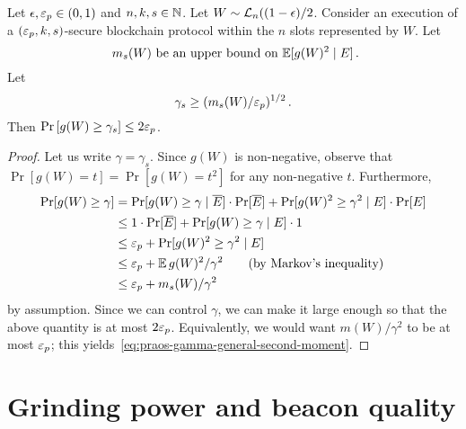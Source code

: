 \begin{lemma}\label{lemma:praos-tail-gamma}
  Let $\epsilon, \mathsf{\varepsilon}_p \in (0, 1)$ and $n, k, s \in \mathbb{N}$. 
  Let $W \sim \mathcal{L}_n((1-\epsilon)/2$.
  Consider an execution of a $(\mathsf{\varepsilon}_p, k, s)$-secure blockchain protocol within
  the $n$ slots represented by $W$. 
  Let 
  $$
    \text{ $m_s(W)$ be an upper bound on $\operatorname{\mathbb{E}}[ g(W)^2 \mid E]$}\,.
  $$
  Let 
  \begin{equation}\label{eq:praos-gamma-general-second-moment}
    \gamma_s \geq (m_s(W)/\mathsf{\varepsilon}_p)^{1/2}
    \,.
  \end{equation}
  Then 
  $
      \Pr\left[g(W) \geq \gamma_s \right] \leq 2 \mathsf{\varepsilon}_p
  $.
\end{lemma}
\begin{proof}
  Let us write $\gamma = \gamma_s$.
  Since $g(W)$ is non-negative, observe that 
  $\Pr[g(W) = t] = \Pr[g(W) = t^2]$ for any non-negative $t$. 
  Furthermore, 
  \begin{align*}
    \Pr[g(W) \geq \gamma]
    &= \Pr[g(W) \geq \gamma \mid \overline{E}] \cdot \Pr[\overline{E}] 
      + \Pr[g(W)^2 \geq \gamma^2 \mid E] \cdot \Pr[E]\\
    &\leq 1 \cdot \Pr[\overline{E}] + \Pr[g(W) \geq \gamma \mid E] \cdot 1 \\
    &\leq \mathsf{\varepsilon}_p + \Pr[g(W)^2 \geq \gamma^2 \mid E] \\
    &\leq \mathsf{\varepsilon}_p + \operatorname{\mathbb{E}} g(W)^2/\gamma^2 \qquad \text{(by Markov's inequality)} \\
    &\leq \mathsf{\varepsilon}_p + m_s(W)/\gamma^2 
  \end{align*}
  by assumption. Since we can control $\gamma$,
  we can make it large enough so that the above quantity is at most $2 \mathsf{\varepsilon}_p$. 
  Equivalently, we would want 
  $m(W)/\gamma^2$ to be at most $\mathsf{\varepsilon}_p$; 
  this yields~\eqref{eq:praos-gamma-general-second-moment}. 
\end{proof}


\section{Grinding power and beacon quality}

